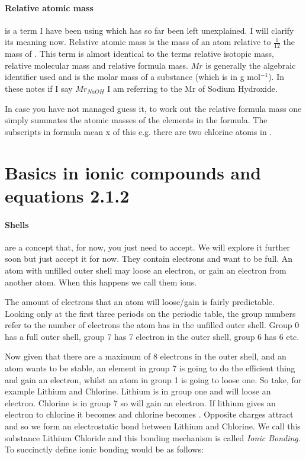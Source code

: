 	\paragraph{Relative atomic mass} is a term I have been using which has so far been left unexplained.
	I will clarify its meaning now. Relative atomic mass is the mass of an atom relative to $\frac{1}{12}$ the mass of .
	This term is almost identical to the terms relative isotopic mass, relative molecular mass and relative formula mass.
	$Mr$ is generally the algebraic identifier used and is the molar mass of a substance (which is in g mol$^{-1}$).
	In these notes if I say $Mr_{NaOH}$ I am referring to the Mr of Sodium Hydroxide.
	
	In case you have not managed guess it, to work out the relative formula mass one simply summates the atomic masses of the elements in the formula.
	The subscripts in formula mean x of this e.g. there are two chlorine atoms in .
	
\section{Basics in ionic compounds and equations 2.1.2}
	
	\paragraph{Shells} are a concept that, for now, you just need to accept.
	We will explore it further soon but just accept it for now.
	They contain electrons and want to be full.
	An atom with unfilled outer shell may loose an electron, or gain an electron from another atom. When this happens we call them ions. 
	
	The amount of electrons that an atom will loose/gain is fairly predictable.
	Looking only at the first three periods on the periodic table, the group numbers refer to the number of electrons the atom has in the unfilled outer shell.
	Group 0 has a full outer shell, group 7 has 7 electron in the outer shell, group 6 has 6 etc.
	
	Now given that there are a maximum of 8 electrons in the outer shell, and an atom wants to be stable, an element in group 7 is going to do the efficient thing and gain an electron, whilst an atom in group 1 is going to loose one.
	So take, for example Lithium and Chlorine. Lithium is in group one and will loose an electron.
	Chlorine is in group 7 so will gain an electron. If lithium gives an electron to chlorine it becomes  and chlorine becomes .
	Opposite charges attract and so we form an electrostatic bond between Lithium and Chlorine.
	We call this substance Lithium Chloride and this bonding mechanism is called \textit{Ionic Bonding}.
	To succinctly define ionic bonding would be as follows:
	
